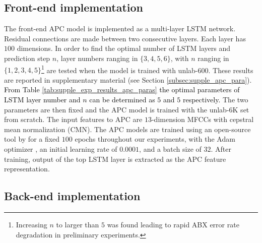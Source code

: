 \documentclass[transmag]{IEEEtran}
\begin{document}
\subsection{Front-end implementation}
The front-end APC model is implemented as a multi-layer LSTM network. Residual connections are made between two consecutive layers. Each layer has $100$ dimensions. 
In order to find the optimal number  of LSTM layers and prediction step $n$, layer numbers ranging in $\{3,4,5,6\}$, with   $n$ ranging in $\{1,2,3,4,5\}$\footnote{Increasing $n$ to larger than $5$ was found leading to rapid ABX error rate degradation in preliminary experiments.} are  tested when the model is trained with unlab-600. These results are reported in supplementary material (see Section \ref{subsec:supple_apc_para}).
\textcolor{black}{From Table \ref{tab:supple_exp_results_apc_paras} the optimal parameters of LSTM layer number and $n$ can be determined as $5$ and $5$ respectively.}
The two parameters are then fixed and the APC  model is  trained with the unlab-6K set from scratch. The input features to APC are $13$-dimension MFCCs with cepstral mean normalization (CMN). The APC models are trained using an open-source tool by \cite{Chung2019} for a fixed $100$ epochs throughout our experiments, with the Adam optimizer \cite{kingma2014adam}, an initial learning rate of $0.0001$, and a batch size of $32$. After training, output of the top LSTM layer is extracted as the APC feature representation. %

\subsection{Back-end implementation}
\end{document}
